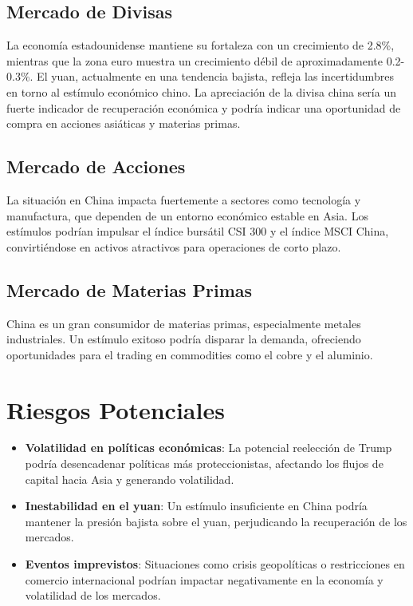 \documentclass{article}
\begin{document}
\subsection{Mercado de Divisas}
La economía estadounidense mantiene su fortaleza con un crecimiento de 2.8\%, mientras que la zona euro muestra un crecimiento débil de aproximadamente 0.2-0.3\%. El yuan, actualmente en una tendencia bajista, refleja las incertidumbres en torno al estímulo económico chino. La apreciación de la divisa china sería un fuerte indicador de recuperación económica y podría indicar una oportunidad de compra en acciones asiáticas y materias primas.

\subsection{Mercado de Acciones}
La situación en China impacta fuertemente a sectores como tecnología y manufactura, que dependen de un entorno económico estable en Asia. Los estímulos podrían impulsar el índice bursátil CSI 300 y el índice MSCI China, convirtiéndose en activos atractivos para operaciones de corto plazo.

\subsection{Mercado de Materias Primas}
China es un gran consumidor de materias primas, especialmente metales industriales. Un estímulo exitoso podría disparar la demanda, ofreciendo oportunidades para el trading en commodities como el cobre y el aluminio.

\section{Riesgos Potenciales}
\begin{itemize}
    \item \textbf{Volatilidad en políticas económicas}: La potencial reelección de Trump podría desencadenar políticas más proteccionistas, afectando los flujos de capital hacia Asia y generando volatilidad.
    \item \textbf{Inestabilidad en el yuan}: Un estímulo insuficiente en China podría mantener la presión bajista sobre el yuan, perjudicando la recuperación de los mercados.
    \item \textbf{Eventos imprevistos}: Situaciones como crisis geopolíticas o restricciones en comercio internacional podrían impactar negativamente en la economía y volatilidad de los mercados.
\end{itemize}
\end{document}
